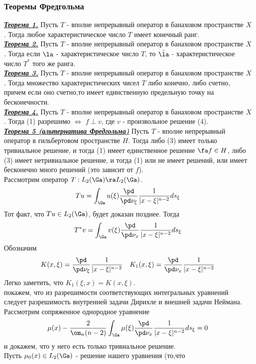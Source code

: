\documentclass[a4paper,draft]{article}
\begin{document}
\subsubsection{Теоремы Фредгольма}
\underline{\textit{\textbf{Теорема 1.}}} Пусть $T$ - вполне
непрерывный оператор в банаховом пространстве $X$. Тогда любое
характеристическое число $T$ имеет конечный ранг.\\
\underline{\textit{\textbf{Теорема 2.}}} Пусть $T$ - вполне
непрерывный оператор в банаховом пространстве $X$. Тогда если
$\la$ - характеристическое число $T$, то $\bar{\la}$ -
характеристическое число $T^*$ того же ранга.\\
\underline{\textit{\textbf{Теорема 3.}}} Пусть $T$ - вполне
непрерывный оператор в банаховом пространстве $X$. Тогда множество
характеристических чисел $T$ либо конечно, либо счетно, причем
если оно счетно,то имеет единственную предельную точку на
бесконечности.\\
\underline{\textit{\textbf{Теорема 4.}}} Пусть $T$ - вполне
непрерывный оператор в банаховом пространстве $X$. Тогда (1)
разрешимо $\Leftrightarrow$ $f\perp v$, где $v$ - произвольное решение (4).\\
\underline{\textit{\textbf{Теорема 5 (альтернатива Фредгольма)}}}
Пусть $T$ - вполне непрерывный оператор в гильбертовом
пространстве $H$. Тогда либо (3) имеет только тривиальное решение,
и тогда (1) имеет единственное решение $\fa f\in H$, либо (3)
имеет нетривиальное решение, и тогда (1) или не имеет решений, или
имеет бесконечно много решений (это зависит от $f$).\\
Рассмотрим оператор $T:L_2(\Ga)\ra L_2(\Ga)$.
$$
Tu=\int_{\Ga}u(\xi)\frac{\pd}{\pd\nu_{\xi}}\frac{1}{|x-\xi|^{n-2}}ds_{\xi}
$$
Тот факт, что $Tu\in L_2(\Ga)$, будет доказан позднее. Тогда
$$
T^*v=\int_{\Ga}v(\xi)\frac{\pd}{\pd\nu_x}\frac{1}{|x-\xi|^{n-2}}ds_{\xi}
$$
Обозначим
$$K(x,\xi)=\frac{\pd}{\pd\nu_{\xi}}\frac{1}{|x-\xi|^{n-2}}\quad
K_1(x,\xi)=\frac{\pd}{\pd\nu_x}\frac{1}{|x-\xi|^{n-2}}
$$
Легко заметить, что $K_1(\xi,x)=K(x,\xi)$.\\
покажем, что из разрешимости соответствующих интегральных
уравнений следует разрешимость внутренней задачи Дирихле и внешней
задачи Неймана.\\
Рассмотрим сопряженное однородное уравнение
$$
\mu(x)-\frac{2}{\om_n(n-2)}\int_{\Ga}\mu(\xi)\frac{\pd}{\pd\nu_x}\frac{1}{|x-\xi|^{n-2}}ds_{\xi}=0
$$
и докажем, что у него есть только тривиальное решение.\\
Пусть $\mu_0(x)\in L_2(\Ga)$ - решение нашего уравнения (то,что
\end{document}
